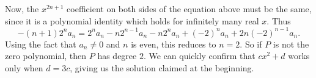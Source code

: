 Now, the $x^{2n+1}$ coefficient on both sides of the equation above must be the same, since it is a polynomial identity which holds for infinitely many real $x$. Thus \[-(n+1)2^na_n=2^na_n-n2^{n-1}a_n-n2^na_n+(-2)^na_n+2n(-2)^{n-1}a_n.\] Using the fact that $a_n\neq0$ and $n$ is even, this reduces to $n=2$. So if $P$ is not the zero polynomial, then $P$ has degree $2$. We can quickly confirm that $cx^2+d$ works only when $d=3c$, giving us the solution claimed at the beginning.